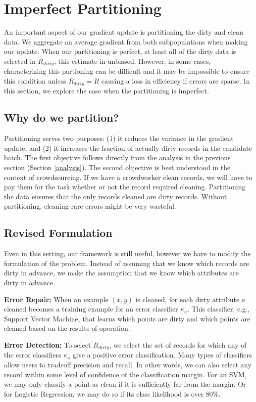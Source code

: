 \section{Imperfect Partitioning}\label{imperfect}
An important aspect of our gradient update is partitioning the dirty and clean data.
We aggregate an average gradient from both subpopulations when making our update.
When our partitioning is perfect, at least all of the dirty data is selected in $R_{dirty}$, this estimate in unbiased.
However, in some cases, characterizing this partioning can be difficult and it may be impossible to ensure this condition unless $R_{dirty} = R$ causing a loss in efficiency if errors are sparse.  
In this section, we explore the case when the partitioning is imperfect.

\subsection{Why do we partition?}
Partitioning serves two purposes: (1) it reduces the variance in the gradient update, and (2) it increases the fraction of actually dirty records in the candidate batch.
The first objective follows directly from the analysis in the previous section (Section \ref{analysis}).
The second objective is best understood in the context of crowdsourcing.
If we have a crowdworker clean records, we will have to pay them for the task whether or not the record required cleaning.
Partitioning the data ensures that the only records cleaned are dirty records.
Without partitioning, cleaning rare errors might be very wasteful. 

\subsection{Revised Formulation}
Even in this setting, our framework is still useful, however we have to modify the formulation of the problem.
Instead of assuming that we know which records are dirty in advance, we make the assumption that we know which attributes are dirty in advance.

\noindent\textbf{Error Repair: } When an example $(x,y)$ is cleaned, for each dirty attribute $a$ cleaned becomes a training example for an error classifier $\kappa_a$. This classifier, e.g., Support Vector Machine, that learns which points are dirty and which points are cleaned based on the results of operation.

\noindent\textbf{Error Detection: } To select $R_{dirty}$, we select the set of records for which any of the error classifiers $\kappa_a$ give a positive error classification.
Many types of classifiers allow users to tradeoff precision and recall.
In other words, we can also select any record within some level of confidence of the classification margin.
For an SVM, we may only classify a point as clean if it is sufficiently far from the margin.
Or for Logistic Regression, we may do so if its class likelihood is over 80\%.

